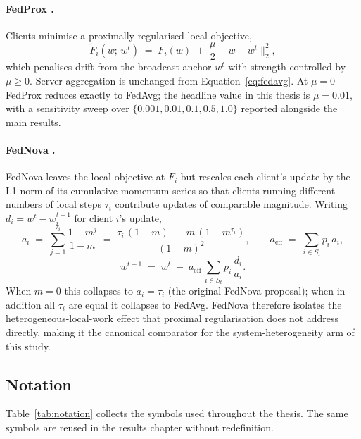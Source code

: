 \documentclass[11pt,a4paper]{article}
\begin{document}
\paragraph{FedProx \citep{li2020fedprox}.}
Clients minimise a proximally regularised local objective,
\begin{equation}
\widetilde F_i(w;\, w^t) \;=\; F_i(w) \;+\; \frac{\mu}{2}\,\bigl\lVert w - w^t\bigr\rVert_2^2,
\label{eq:fedprox-local}
\end{equation}
which penalises drift from the broadcast anchor $w^t$ with strength controlled
by $\mu \ge 0$. Server aggregation is unchanged from
Equation~\ref{eq:fedavg}. At $\mu = 0$ FedProx reduces exactly to FedAvg; the
headline value in this thesis is $\mu = 0.01$, with a sensitivity sweep over
$\{0.001, 0.01, 0.1, 0.5, 1.0\}$ reported alongside the main results.

\paragraph{FedNova \citep{wang2020fednova}.}
FedNova leaves the local objective at $F_i$ but rescales each client's update
by the L1 norm of its cumulative-momentum series so that clients running
different numbers of local steps $\tau_i$ contribute updates of comparable
magnitude. Writing $d_i = w^t - w_i^{t+1}$ for client $i$'s update,
\begin{equation}
a_i \;=\; \sum_{j=1}^{\tau_i} \frac{1 - m^j}{1 - m}
\;=\; \frac{\tau_i\,(1-m) \;-\; m\,(1-m^{\tau_i})}{(1-m)^2},
\qquad
a_{\mathrm{eff}} \;=\; \sum_{i\in S_t} p_i\, a_i,
\label{eq:fednova-ai}
\end{equation}
\begin{equation}
w^{t+1} \;=\; w^t \;-\; a_{\mathrm{eff}} \,\sum_{i\in S_t} p_i\,\frac{d_i}{a_i}.
\label{eq:fednova-agg}
\end{equation}
When $m=0$ this collapses to $a_i = \tau_i$ (the original FedNova proposal);
when in addition all $\tau_i$ are equal it collapses to FedAvg. FedNova
therefore isolates the heterogeneous-local-work effect that proximal
regularisation does not address directly, making it the canonical comparator
for the system-heterogeneity arm of this study.

\subsection{Notation}
Table~\ref{tab:notation} collects the symbols used throughout the thesis.
The same symbols are reused in the results chapter without redefinition.
\end{document}
